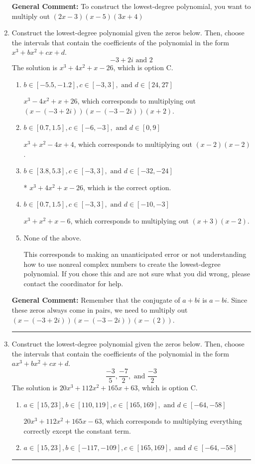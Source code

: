 \documentclass{extbook}[14pt]
\newcommand{\litem}[1]{\item #1

\rule{\textwidth}{0.4pt}}
\begin{document}
\begin{enumerate}
{\textbf{General Comment:} To construct the lowest-degree polynomial, you want to multiply out $(2x -3)(x -5)(3x + 4)$
}
\litem{
Construct the lowest-degree polynomial given the zeros below. Then, choose the intervals that contain the coefficients of the polynomial in the form $x^3+bx^2+cx+d$.
\[ -3 + 2 i \text{ and } 2 \]The solution is \( x^{3} +4 x^{2} +x -26 \), which is option C.\begin{enumerate}[label=\Alph*.]
\item \( b \in [-5.5, -1.2], c \in [-3, 3], \text{ and } d \in [24, 27] \)

$x^{3} -4 x^{2} +x + 26$, which corresponds to multiplying out $(x-(-3 + 2 i))(x-(-3 - 2 i))(x + 2)$.
\item \( b \in [0.7, 1.5], c \in [-6, -3], \text{ and } d \in [0, 9] \)

$x^{3} + x^{2} -4 x + 4$, which corresponds to multiplying out $(x -2)(x -2)$.
\item \( b \in [3.8, 5.3], c \in [-3, 3], \text{ and } d \in [-32, -24] \)

* $x^{3} +4 x^{2} +x -26$, which is the correct option.
\item \( b \in [0.7, 1.5], c \in [-3, 3], \text{ and } d \in [-10, -3] \)

$x^{3} + x^{2} +x -6$, which corresponds to multiplying out $(x + 3)(x -2)$.
\item \( \text{None of the above.} \)

This corresponds to making an unanticipated error or not understanding how to use nonreal complex numbers to create the lowest-degree polynomial. If you chose this and are not sure what you did wrong, please contact the coordinator for help.
\end{enumerate}

\textbf{General Comment:} Remember that the conjugate of $a+bi$ is $a-bi$. Since these zeros always come in pairs, we need to multiply out $(x-(-3 + 2 i))(x-(-3 - 2 i))(x-(2))$.
}
\litem{
Construct the lowest-degree polynomial given the zeros below. Then, choose the intervals that contain the coefficients of the polynomial in the form $ax^3+bx^2+cx+d$.
\[ \frac{-3}{5}, \frac{-7}{2}, \text{ and } \frac{-3}{2} \]The solution is \( 20x^{3} +112 x^{2} +165 x + 63 \), which is option C.\begin{enumerate}[label=\Alph*.]
\item \( a \in [15, 23], b \in [110, 119], c \in [165, 169], \text{ and } d \in [-64, -58] \)

$20x^{3} +112 x^{2} +165 x -63$, which corresponds to multiplying everything correctly except the constant term.
\item \( a \in [15, 23], b \in [-117, -109], c \in [165, 169], \text{ and } d \in [-64, -58] \)


\end{enumerate}}
\end{enumerate}
\end{document}
